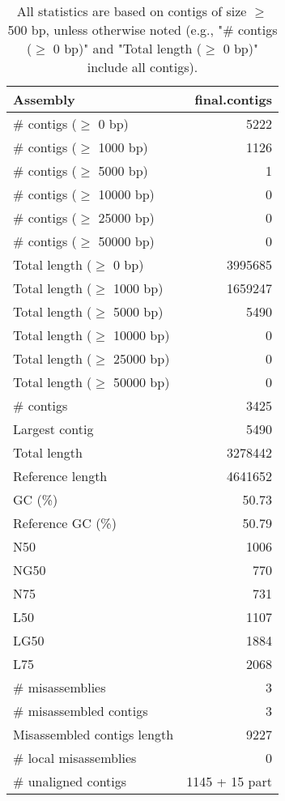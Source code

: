 \documentclass[12pt,a4paper]{article}
\begin{document}
\begin{table}[ht]
\begin{center}
\caption{All statistics are based on contigs of size $\geq$ 500 bp, unless otherwise noted (e.g., "\# contigs ($\geq$ 0 bp)" and "Total length ($\geq$ 0 bp)" include all contigs).}
\begin{tabular}{|l*{1}{|r}|}
\hline
Assembly & final.contigs \\ \hline
\# contigs ($\geq$ 0 bp) & 5222 \\ \hline
\# contigs ($\geq$ 1000 bp) & 1126 \\ \hline
\# contigs ($\geq$ 5000 bp) & 1 \\ \hline
\# contigs ($\geq$ 10000 bp) & 0 \\ \hline
\# contigs ($\geq$ 25000 bp) & 0 \\ \hline
\# contigs ($\geq$ 50000 bp) & 0 \\ \hline
Total length ($\geq$ 0 bp) & 3995685 \\ \hline
Total length ($\geq$ 1000 bp) & 1659247 \\ \hline
Total length ($\geq$ 5000 bp) & 5490 \\ \hline
Total length ($\geq$ 10000 bp) & 0 \\ \hline
Total length ($\geq$ 25000 bp) & 0 \\ \hline
Total length ($\geq$ 50000 bp) & 0 \\ \hline
\# contigs & 3425 \\ \hline
Largest contig & 5490 \\ \hline
Total length & 3278442 \\ \hline
Reference length & 4641652 \\ \hline
GC (\%) & 50.73 \\ \hline
Reference GC (\%) & 50.79 \\ \hline
N50 & 1006 \\ \hline
NG50 & 770 \\ \hline
N75 & 731 \\ \hline
L50 & 1107 \\ \hline
LG50 & 1884 \\ \hline
L75 & 2068 \\ \hline
\# misassemblies & 3 \\ \hline
\# misassembled contigs & 3 \\ \hline
Misassembled contigs length & 9227 \\ \hline
\# local misassemblies & 0 \\ \hline
\# unaligned contigs & 1145 + 15 part \\ \hline

\end{tabular}
\end{center}
\end{table}
\end{document}

